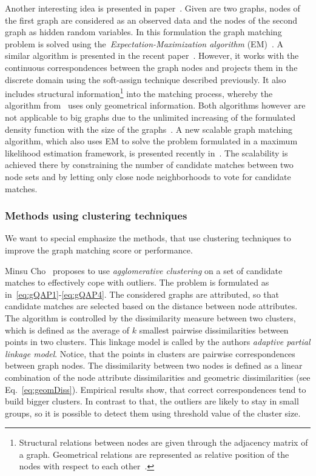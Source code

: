 Another interesting idea is presented in paper~\cite{Hancock_EM_SVD}. Given are two graphs, nodes of the first graph are considered as an observed data and the nodes of the second graph as hidden random variables. In this formulation the graph matching problem is solved using the~\emph{Expectation-Maximization algorithm} (EM)~\cite{EM_Dempster1977}. A similar algorithm is presented in the recent paper~\cite{Sanrom2012}. However, it works with the continuous correspondences between the graph nodes and projects them in the discrete domain using the soft-assign technique described previously. It also includes structural information\footnote{Structural relations between nodes are given through the adjacency matrix of a graph. Geometrical relations are represented as relative position of the nodes with respect to each other~\cite{Sanrom2012}.} into the matching process, whereby the algorithm from~\cite{Hancock_EM_SVD} uses only geometrical information. Both algorithms however are not applicable to big graphs due to the unlimited increasing of the formulated density function with the size of the graphs~\cite{Armiti2014}. A new scalable graph matching algorithm, which also uses EM to solve the problem formulated in a maximum likelihood estimation framework, is presented recently in~\cite{Armiti2014}. The scalability is achieved there by constraining the number of candidate matches between two node sets and by letting only close node neighborhoods to vote for candidate matches.
\subsubsection{Methods using clustering techniques}
We want to special emphasize the methods, that use clustering techniques to improve the graph matching score or performance.

Minsu Cho~\cite{Cho2009_AgglClustering} proposes to use \emph{agglomerative clustering} on a set of candidate matches to effectively cope with outliers. The problem is formulated as in~\eqref{eq:gQAP1}-\eqref{eq:gQAP4}. The considered graphs are attributed, so that candidate matches are selected based on the distance between node attributes. The algorithm is controlled by the dissimilarity measure between two clusters, which is defined as the average of $k$ smallest pairwise dissimilarities between points in two clusters. This linkage model is called by the authors \emph{adaptive partial linkage model}. Notice, that the points in clusters are pairwise correspondences between graph nodes. The dissimilarity between two nodes is defined as a linear combination of the node attribute dissimilarities and 
geometric dissimilarities (see Eq.~\eqref{eq:geomDiss}). Empirical results show, that correct correspondences tend to build bigger clusters. In contrast to that, the outliers are likely to stay in small groups, so it is possible to detect them using threshold value of the cluster size.

